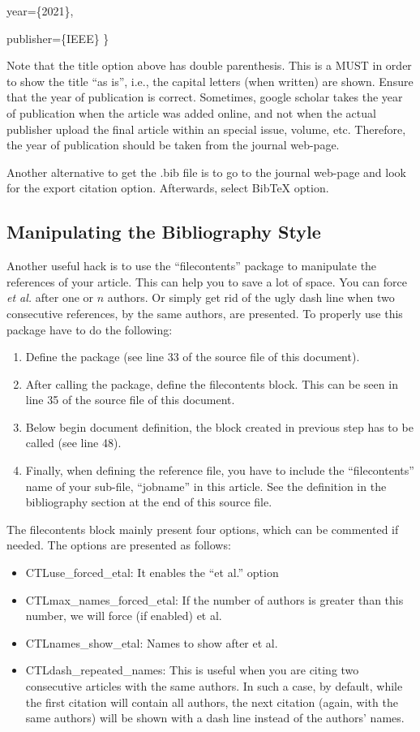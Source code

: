 \documentclass[conference]{IEEEtran}
\begin{document}
  year=\{2021\},
  
  publisher=\{IEEE\}
\}
    
Note that the title option above has double parenthesis.
This is a MUST in order to show the title ``as is'', i.e., the capital letters (when written) are shown.
Ensure that the year of publication is correct.
Sometimes, google scholar takes the year of publication when the article was added online, and not when the actual publisher upload the final article within an special issue, volume, etc.
Therefore, the year of publication should be taken from the journal web-page.

Another alternative to get the .bib file is to go to the journal web-page and look for the export citation option.
Afterwards, select BibTeX option. 

\subsection{Manipulating the Bibliography Style}
Another useful hack is to use the ``filecontents'' package to manipulate the references of your article. 
This can help you to save a lot of space.
You can force \textit{et al.} after one or $n$ authors. 
Or simply get rid of the ugly dash line when two consecutive references, by the same authors, are presented. 
To properly use this package have to do the following:
\begin{enumerate}
    \item Define the package (see line 33 of the source file of this document).
    \item After calling the package, define the filecontents block. 
    This can be seen in line 35 of the source file of this document.
    \item Below begin document definition, the block created in previous step has to be called (see line 48).
    \item Finally, when defining the reference file, you have to include the ``filecontents'' name of your sub-file, ``jobname'' in this article.
    See the definition in the bibliography section at the end of this source file. 
\end{enumerate}

The filecontents block mainly present four options, which can be commented if needed.
The options are presented as follows:
\begin{itemize}
    \item CTLuse\_forced\_etal: It enables the ``et al.'' option 
    \item CTLmax\_names\_forced\_etal: If the number of authors is greater than this number, we will force (if enabled) et al.
    \item CTLnames\_show\_etal: Names to show after et al.
    \item CTLdash\_repeated\_names: This is useful when you are citing two consecutive articles with the same authors.
    In such a case, by default, while the first citation will contain all authors, the next citation (again, with the same authors) will be shown with a dash line instead of the authors' names.
\end{itemize}
\end{document}
